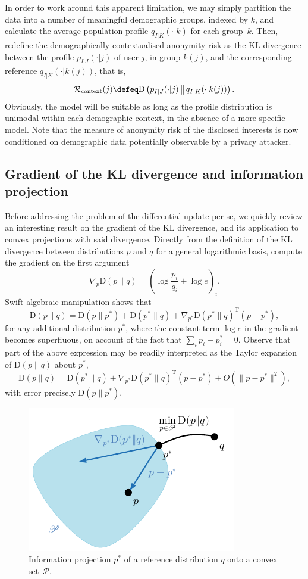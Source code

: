In order to work around this apparent limitation, we may simply partition the data into a number of meaningful demographic groups, indexed by $k$, and calculate the average population profile $q_{I|K}(\cdot|k)$ for each group~$k$. Then, redefine the demographically contextualised anonymity risk as the KL divergence between the profile $p_{I|J}(\cdot|j)$ of user $j$, in group $k(j)$, and the corresponding reference $q_{I|K}(\cdot|k(j))$, that is,
$$\mathcal{R}_\text{context}(j)\defeq\text{D}\left(p_{I|J}(\cdot|j)\,\middle\|\,q_{I|K}(\cdot|k(j))\right).$$
Obviously, the model will be suitable as long as the profile distribution is unimodal within each demographic context, in the absence of a more specific model. Note that the measure of anonymity risk of the disclosed interests is now conditioned on demographic data potentially observable by a privacy attacker.

\subsection{Gradient of the KL divergence and information projection}
\label{sec:1.3}

\noindent
Before addressing the problem of the differential update per se, we quickly review an interesting result on the gradient of the KL divergence, and its application to convex projections with said divergence. Directly from the definition of the KL divergence between distributions $p$ and $q$ for a general logarithmic basis, compute the gradient on the first argument
$$\nabla_p\text{D}(p\|q)={\left(\log \frac{p_i}{q_i}+\log e\right)}_i.$$
Swift algebraic manipulation shows that
$$\text{D}(p\|q)=\text{D}(p\|p^*)+\text{D}(p^*\|q)+\nabla_{p^*}\text{D}(p^*\|q)^\text{T}(p-p^*),$$
for any additional distribution $p^*$, where the constant term $\log e$ in the gradient becomes superfluous, on account of the fact that $\sum_i p_i-p_i^*=0$. Observe that part of the above expression may be readily interpreted as the Taylor expansion of $\text{D}(p\|q)$ about $p^*$,
$$\text{D}(p\|q)=\text{D}(p^*\|q)+\nabla_{p^*}\text{D}(p^*\|q)^\text{T}(p-p^*)+O(\|p-p^*\|^2),$$
with error precisely $\text{D}(p\|p^*)$.

\begin{figure}[htb]
\centering
\includegraphics[scale=\FigScale]{figures/ConvProj.pdf}
\caption{Information projection $p^*$ of a reference distribution $q$ onto a convex set~$\mathscr{P}$.}
\label{fig:1}
\end{figure}

